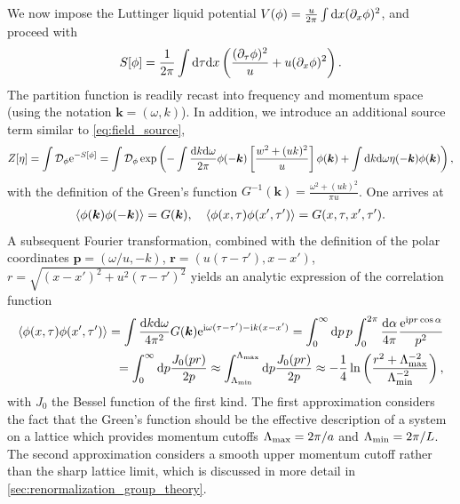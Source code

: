 We now impose the Luttinger liquid potential $V(\phi) = \frac u{2\pi}\int\mathrm d x(\partial_x\phi)^2$, and proceed with
\begin{align}
    S[\phi]=\frac1{2\pi}\int\mathrm d\tau\mathrm d x\left(  \frac{(\partial_\tau\phi)^2}{u} + u(\partial_x\phi)^2 \right).
\end{align}
The partition function is readily recast into frequency and momentum space (using the notation ${\bm k}=(\omega, k)$).
In addition, we introduce an additional source term similar to \cref{eq:field_source},
\begin{align}
    Z[\eta] = \int\mathcal D_\phi \mathrm e^{-S[\phi]} = \int\mathcal D_\phi \exp\left( -\int\frac{\mathrm d k\mathrm d\omega}{2\pi}\phi(-{\bm k})\left[ \frac{w^2+(uk)^2}{u} \right]\phi({\bm k}) +\int\mathrm d k\mathrm d\omega\eta(-{\bm k})\phi({\bm k}) \right),
    \label{eq:full_partition_function}
\end{align}
with the definition of the Green's function $G^{-1}({\bm k})=\frac{\omega^2+(uk)^2}{\pi u}$.
One arrives at
\begin{align}
    \braket{\phi({\bm k})\phi(-{\bm k})} = G({\bm k})
    ,\quad
    \braket{\phi(x,\tau)\phi(x',\tau')} = G(x,\tau,x',\tau').
    \label{eq:KG_greens_functions_equality}
\end{align}
A subsequent Fourier transformation, combined with the definition of the polar coordinates ${\bm p}=(\omega/u,-k)$, ${\bm r} = (u(\tau-\tau'), x-x')$, $r = \sqrt{(x-x')^2+u^2(\tau-\tau')^2}$ yields an analytic expression of the correlation function
\begin{align}
    \braket{\phi(x,\tau)\phi(x',\tau')}
    = \int\frac{\mathrm d k\mathrm d\omega}{4\pi^2}G({\bm k})\mathrm e^{\mathrm i\omega(\tau-\tau')-\mathrm i k(x-x')}
    = \int_0^\infty\mathrm d p\, p\int_0^{2\pi}\frac{\mathrm d\alpha}{4\pi}\frac{\mathrm e^{\mathrm i pr\cos\alpha}}{p^2}
    \\
    = \int_0^\infty\mathrm d p\frac{J_0(pr)}{2p}
    \approx
    \int_{\Lambda_{\rm min}}^{\Lambda_{\rm max}}\mathrm d p \frac{J_0(pr)}{2p}
    \approx
    -\frac14\ln\left( \frac{r^2+\Lambda_{\rm max}^{-2}}{\Lambda_{\rm min}^{-2}} \right),
    \label{eq:kg_correlations_approximation}
\end{align}
with $J_0$ the Bessel function of the first kind.
The first approximation considers the fact that the Green's function should be the effective description of a system on a lattice which provides momentum cutoffs $\Lambda_{\rm max} = 2\pi/a$ and $\Lambda_{\rm min} = 2\pi/L$.
The second approximation considers a smooth upper momentum cutoff rather than the sharp lattice limit, which is discussed in more detail in \cref{sec:renormalization_group_theory}.

